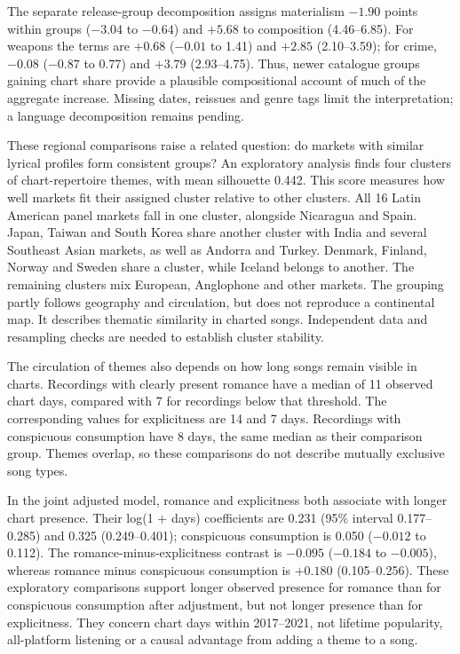 \documentclass[10pt,a4paper,twocolumn]{article}
\begin{document}
The separate release-group decomposition assigns materialism $-1.90$ points within groups ($-3.04$ to $-0.64$) and $+5.68$ to composition (4.46--6.85). For weapons the terms are $+0.68$ ($-0.01$ to 1.41) and $+2.85$ (2.10--3.59); for crime, $-0.08$ ($-0.87$ to 0.77) and $+3.79$ (2.93--4.75). Thus, newer catalogue groups gaining chart share provide a plausible compositional account of much of the aggregate increase. Missing dates, reissues and genre tags limit the interpretation; a language decomposition remains pending.

These regional comparisons raise a related question: do markets with similar lyrical profiles form consistent groups? An exploratory analysis finds four clusters of chart-repertoire themes, with mean silhouette 0.442. This score measures how well markets fit their assigned cluster relative to other clusters. All 16 Latin American panel markets fall in one cluster, alongside Nicaragua and Spain. Japan, Taiwan and South Korea share another cluster with India and several Southeast Asian markets, as well as Andorra and Turkey. Denmark, Finland, Norway and Sweden share a cluster, while Iceland belongs to another. The remaining clusters mix European, Anglophone and other markets. The grouping partly follows geography and circulation, but does not reproduce a continental map. It describes thematic similarity in charted songs. Independent data and resampling checks are needed to establish cluster stability.

The circulation of themes also depends on how long songs remain visible in charts. Recordings with clearly present romance have a median of 11 observed chart days, compared with 7 for recordings below that threshold. The corresponding values for explicitness are 14 and 7 days. Recordings with conspicuous consumption have 8 days, the same median as their comparison group. Themes overlap, so these comparisons do not describe mutually exclusive song types.

In the joint adjusted model, romance and explicitness both associate with longer chart presence. Their log(1 + days) coefficients are 0.231 (95\% interval 0.177--0.285) and 0.325 (0.249--0.401); conspicuous consumption is 0.050 ($-0.012$ to 0.112). The romance-minus-explicitness contrast is $-0.095$ ($-0.184$ to $-0.005$), whereas romance minus conspicuous consumption is $+0.180$ (0.105--0.256). These exploratory comparisons support longer observed presence for romance than for conspicuous consumption after adjustment, but not longer presence than for explicitness. They concern chart days within 2017--2021, not lifetime popularity, all-platform listening or a causal advantage from adding a theme to a song.
\end{document}
